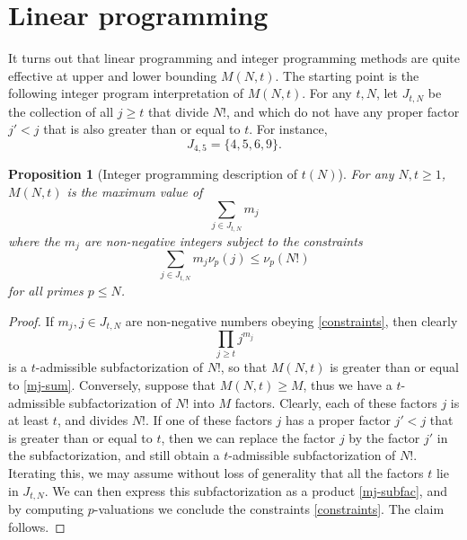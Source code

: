 \documentclass[12pt,a4paper,reqno]{amsart}
\numberwithin{equation}{section}
\theoremstyle{plain}
\newtheorem{proposition}[theorem]{Proposition}
\theoremstyle{definition}
\begin{document}
\begin{table}[htp!]
\caption{For sample values of $N \in [10^5, 10^9]$, the performance of the fast greedy algorithm (using heuristically chosen $t\in [t_0(N),t_1(N)]$), and the standard greedy algorithm (using  exhaustively computed $t_1(N)$), compared against the lower bound $t(N)_-$ obtained from the linear programming method of . All computations were performed on an Intel i9-13900KS CPU with 24 cores. The fast heuristic computations were single-threaded computations, while exhaustive greedy computations used 32 threads running on 24 cores.}\label{greedy-table}
\end{table}

\section{Linear programming}\label{linprog-sec}

It turns out that linear programming and integer programming methods are quite effective at upper and lower bounding $M(N,t)$.  The starting point is the following integer program interpretation of $M(N,t)$. For any $t,N$, let $J_{t,N}$ be the collection of all $j \geq t$ that divide $N!$, and which do not have any proper factor $j' < j$ that is also greater than or equal to $t$.  For instance,
$$ J_{4,5} = \{ 4, 5, 6, 9 \}.$$ 

\begin{proposition}[Integer programming description of $t(N)$]\label{fip}  For any $N,t \geq 1$, $M(N,t)$ is the maximum value of
\begin{equation}\label{mj-sum}
   \sum_{j \in J_{t,N}} m_j
\end{equation}
where the $m_j$ are non-negative integers subject to the constraints
\begin{equation}\label{constraints}
  \sum_{j \in J_{t,N}} m_j \nu_p(j) \leq \nu_p(N!)
\end{equation}
for all primes $p \leq N$.
\end{proposition}

\begin{proof}  If $m_j, j \in J_{t,N}$ are non-negative numbers obeying \eqref{constraints}, then clearly
  \begin{equation}\label{mj-subfac} 
    \prod_{j \geq t} j^{m_j}
  \end{equation}
is a $t$-admissible subfactorization of $N!$, so that $M(N,t)$ is greater than or equal to \eqref{mj-sum}. Conversely, suppose that $M(N,t) \geq M$, thus we have a $t$-admissible subfactorization of $N!$ into $M$ factors.  Clearly, each of these factors $j$ is at least $t$, and divides $N!$.
If one of these factors $j$ has a proper factor $j' < j$ that is greater than or equal to $t$, then we can replace the factor $j$ by the factor $j'$ in the subfactorization, and still obtain a $t$-admissible subfactorization of $N!$.  Iterating this, we may assume without loss of generality that all the factors $t$ lie in $J_{t,N}$.  We can then express this subfactorization as a product \eqref{mj-subfac}, and by computing $p$-valuations we conclude the constraints \eqref{constraints}.  The claim follows.
\end{proof}
\end{document}
